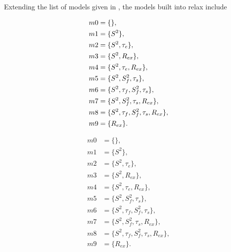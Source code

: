 \begin{htmlonly}
\begin{htmlonly}
Extending the list of models given in \citet{Mandel95, Fushman97, Orekhov99b, Korzhnev01, Zhuravleva04}, the models built into relax include
\begin{latexonly}
\begin{subequations}
\renewcommand{\theequation}{\theparentequation .\arabic{equation}}
\addtocounter{equation}{-1}
\begin{align}
 m0 &= \{\},                                   \label{model: m0} \\
 m1 &= \{S^2\},                                \label{model: m1} \\
 m2 &= \{S^2, \tau_e\},                        \label{model: m2} \\
 m3 &= \{S^2, R_{ex}\},                        \label{model: m3} \\
 m4 &= \{S^2, \tau_e, R_{ex}\},                \label{model: m4} \\
 m5 &= \{S^2, S^2_f, \tau_s\},                 \label{model: m5} \\
 m6 &= \{S^2, \tau_f, S^2_f, \tau_s\},         \label{model: m6} \\
 m7 &= \{S^2, S^2_f, \tau_s, R_{ex}\},         \label{model: m7} \\
 m8 &= \{S^2, \tau_f, S^2_f, \tau_s, R_{ex}\}, \label{model: m8} \\
 m9 &= \{R_{ex}\}.                             \label{model: m9}
\end{align}
\end{subequations}
\end{latexonly}
\begin{htmlonly}
\begin{eqnarray}
 m0 &= \{\},                                   \label{model: m0} \\
 m1 &= \{S^2\},                                \label{model: m1} \\
 m2 &= \{S^2, \tau_e\},                        \label{model: m2} \\
 m3 &= \{S^2, R_{ex}\},                        \label{model: m3} \\
 m4 &= \{S^2, \tau_e, R_{ex}\},                \label{model: m4} \\
 m5 &= \{S^2, S^2_f, \tau_s\},                 \label{model: m5} \\
 m6 &= \{S^2, \tau_f, S^2_f, \tau_s\},         \label{model: m6} \\
 m7 &= \{S^2, S^2_f, \tau_s, R_{ex}\},         \label{model: m7} \\
 m8 &= \{S^2, \tau_f, S^2_f, \tau_s, R_{ex}\}, \label{model: m8} \\
 m9 &= \{R_{ex}\}.                             \label{model: m9}
\end{eqnarray}
\end{htmlonly}


\end{htmlonly}
\end{htmlonly}
